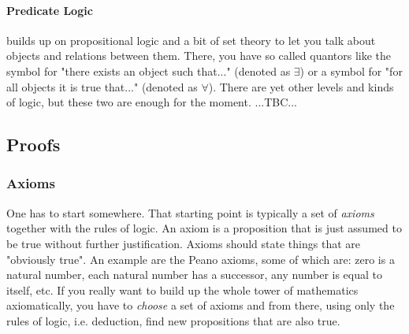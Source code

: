 


\paragraph{Predicate Logic} builds up on propositional logic and a bit of set theory to let you talk about objects and relations between them. There, you have so called quantors like the symbol for "there exists an object such that..." (denoted as $\exists$) or a symbol for "for all objects it is true that..." (denoted as $\forall$). There are yet other levels and kinds of logic, but these two are enough for the moment. ...TBC...

\subsection{Proofs} %

\subsubsection{Axioms}
One has to start somewhere. That starting point is typically a set of \emph{axioms} together with the rules of logic. An axiom is a proposition that is just assumed to be true without further justification. Axioms should state things that are "obviously true". An example are the Peano axioms, some of which are: zero is a natural number, each natural number has a successor, any number is equal to itself, etc. If you really want to build up the whole tower of mathematics axiomatically, you have to \emph{choose} a set of axioms and from there, using only the rules of logic, i.e. deduction, find new propositions that are also true.

